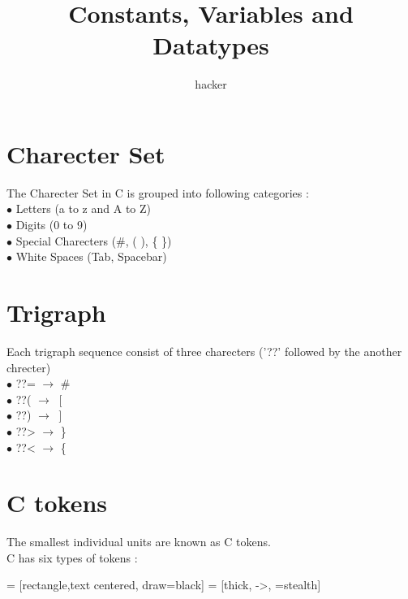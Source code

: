 \documentclass{article}
\date{}
\author{hacker}
\begin{document}
	\title{Constants, Variables and Datatypes}
	\maketitle
	
	\newpage
	
	\section{Charecter Set}
	The Charecter Set in C is grouped into following categories : \\
	$ \bullet $ Letters (a to z and A to Z) \\
	$ \bullet $ Digits (0 to 9) \\
	$ \bullet $ Special Charecters (\#, ( ), \{ \}) \\
	$ \bullet $ White Spaces (Tab, Spacebar)
	
	\section{Trigraph}
	Each trigraph sequence consist of three charecters ('??' followed by the another chrecter) \\
	$ \bullet $ ??= $\rightarrow$ \# \\
	$ \bullet $ ??( $\rightarrow ~ $  [ \\
	$ \bullet $ ??) $\rightarrow ~ $  ] \\
	$ \bullet $ ??> $\rightarrow$ \} \\
	$ \bullet $ ??< $\rightarrow$ \{
	
	\section{C tokens}
	The smallest individual units are known as C tokens. \\
	C has six types of tokens :
	
	 = [rectangle,text centered, draw=black]
	 = [thick, ->, =stealth]
	
\end{document}
